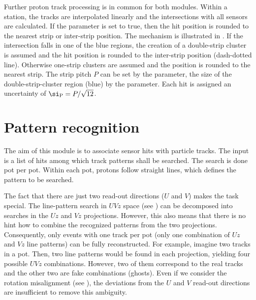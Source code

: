 Further proton track processing is in common for both modules. Within a station, the tracks are interpolated linearly and the intersections with all sensors are calculated. If the  parameter is set to true, then the hit position is rounded to the nearest strip or inter-strip position. The mechanism is illustrated in . If the intersection falls in one of the blue regions, the creation of a double-strip cluster is assumed and the hit position is rounded to the inter-strip position (dash-dotted line). Otherwise one-strip clusters are assumed and the position is rounded to the nearest strip. The strip pitch $P$ can be set by the  parameter, the size of the double-strip-cluster region (blue) by the  parameter. Each hit is assigned an uncertainty of $\si_{\rm P} = P/\sqrt{12}$.



\section[pattern reco]{Pattern recognition}

The aim of this module is to associate sensor hits with particle tracks. The input is a list of  hits among which track patterns shall be searched. The search is done pot per pot. Within each pot, protons follow straight lines, which defines the pattern to be searched.

The fact that there are just two read-out directions ($U$ and $V$) makes the task special. The line-pattern search in $UVz$ space (see ) can be decomposed into searches in the $Uz$ and $Vz$ projections. However, this also means that there is no hint how to combine the recognized patterns from the two projections. Consequently, only events with one track per pot (only one combination of $Uz$ and $Vz$ line patterns) can be fully reconstructed. For example, imagine two tracks in a pot. Then, two line patterns would be found in each projection, yielding four possible $UVz$ combinations. However, two of them correspond to the real tracks and the other two are fake combinations (ghosts). Even if we consider the rotation misalignment (see ), the deviations from the $U$ and $V$ read-out directions are insufficient to remove this ambiguity. 

